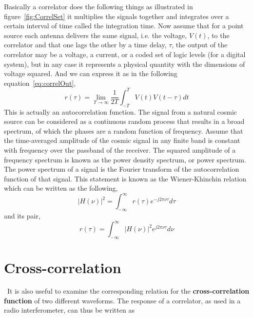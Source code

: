 Basically a correlator does the following things as illustrated in figure~\ref{fig:CorrelSet} it multiplies the signals together and integrates over a certain interval of time called the integration time. Now assume that for a point source each antenna delivers the same signal, i.e. the voltage, $V(t)$, to the correlator and that one lags the other by a time delay, $\tau$, the output of the correlator may be a voltage, a current, or a coded set of logic levels (for a digital system), but in any case it represents a physical quantity with the dimensions of voltage squared. And we can express it as in the following equation~\ref{eq:correlOut},
\begin{equation}
\label{eq:correlOut}
r(\tau) = \lim_{T \to \infty}\frac{1}{2T}\int^{T}_{-T}{V(t)V(t-\tau)dt}
\end{equation}
This is actually an autocorrelation function.
The signal from a natural cosmic source can be considered as a continuous random process that results in a broad spectrum, of which the phases are a random function of frequency. Assume that the time-averaged amplitude of the cosmic signal in any finite band is constant with frequency over the passband of the receiver. The squared amplitude of a frequency spectrum is known as the power density spectrum, or power spectrum. The power spectrum of a signal is the Fourier transform of the autocorrelation function of that signal. This statement is known as the Wiener-Khinchin relation which can be written as the following,
\begin{equation}
\label{eq:WKRelPow}
|H(\nu)|^2 = \int^{\infty}_{-\infty}{r(\tau)e^{-j2\pi{\nu{\tau}}} d\tau}
\end{equation} 
and its pair,
\begin{equation}
\label{eq:WKRelAut}
 r(\tau) = \int^{\infty}_{-\infty}{|H(\nu)|^2{e^{j2\pi{\nu{\tau}}}} d\nu}
\end{equation} 
\section{Cross-correlation}
\label{sec:crxcorrelabt}
{\citep[From][Sec.~3.3]{thompson2008interferometry}}~It is also useful to examine the corresponding relation for the \textbf{cross-correlation function} of two different waveforms. The response of a correlator, as used in a radio interferometer, can thus be written as

